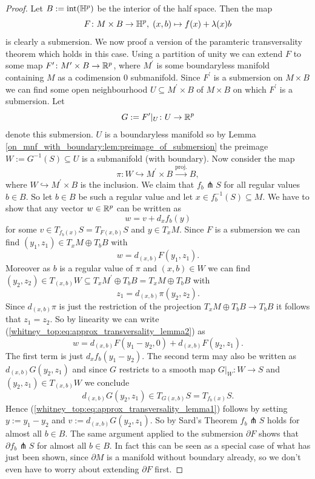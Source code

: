 \begin{proof}
    Let $B := \mathrm{int}(\mathbb{H}^p)$ be the interior of the half space. Then the map 
    \[
    F \colon M \times B \to \mathbb{H}^p, \; (x,b) \mapsto f(x) + \lambda(x)b
    \]
    is clearly a submersion. We now proof a version of the paramteric transversality theorem which holds in this case. Using a partition of unity we can extend $F$ to some map $F^\prime \colon M^\prime \times B \to \mathbb{R}^p$, where $M^\prime$ is some boundaryless manifold containing $M$ as a codimension $0$ submanifold. Since $F^\prime$ is a submersion on $M \times B$ we can find some open neighbourhood $U \subseteq M^\prime \times B$ of $M \times B$ on which $F^\prime$ is a submersion. Let 
    \[
    G := F^\prime|_U \colon U \to \mathbb{R}^p
    \]
    denote this submersion. $U$ is a boundaryless manifold so by Lemma \ref{on_mnf_with_boundary:lem:preimage_of_submersion} the preimage $W:= G^{-1}(S) \subseteq U$ is a submanifold (with boundary). Now consider the map 
    \[
    \pi \colon W \hookrightarrow M^\prime \times B \xrightarrow{\text{proj.}} B,
    \]
    where $W \hookrightarrow M^\prime \times B$ is the inclusion. We claim that $f_b \pitchfork S$ for all regular values $b \in B$. So let $b \in B$ be such a regular value and let $x \in f_b^{-1}(S)\subseteq M$. We have to show that any vector $w \in \mathbb{R}^p$ can be written as 
    \begin{equation}
        \label{whitney_top:eq:approx_transversality_lemma1}
    w = v + d_xf_b(y)
    \end{equation}
    for some $v \in T_{f_b(x)} S = T_{F(x,b)} S$ and $y \in T_xM$. Since $F$ is a submersion we can find $(y_1,z_1) \in T_x M \oplus T_b B$ with 
    \begin{equation}
        \label{whitney_top:eq:approx_transversality_lemma2}
    w = d_{(x,b)}F(y_1,z_1).
    \end{equation}
    Moreover as $b$ is a regular value of $\pi$ and $(x,b) \in W$ we can find $(y_2,z_2) \in T_{(x,b)}W \subseteq T_x M^\prime \oplus T_b B = T_x M \oplus T_b B$ with 
    \[
    z_1 = d_{(x,b)} \pi (y_2,z_2).
    \]
    Since $d_{(x,b)} \pi$ is just the restriction of the projection $T_xM \oplus T_b B \to T_b B$ it follows that $z_1 = z_2$. So by linearity we can write (\ref{whitney_top:eq:approx_transversality_lemma2}) as
    \[
    w = d_{(x,b)}F(y_1-y_2,0) + d_{(x,b)}F(y_2,z_1).
    \]
    The first term is just $d_xf_b(y_1-y_2)$. The second term may also be written as  $d_{(x,b)}G(y_2,z_1)$ and since $G$ restricts to a smooth map $G|_W \colon W \to S$ and $(y_2,z_1) \in T_{(x,b)}W$ we conclude $$d_{(x,b)}G(y_2,z_1) \in T_{G(x,b)} S = T_{f_b(x)}S.$$ Hence (\ref{whitney_top:eq:approx_transversality_lemma1}) follows by setting $y:= y_1-y_2$ and $v := d_{(x,b)}G(y_2,z_1)$. So by Sard's Theorem $f_b \pitchfork S$ holds for almost all $b \in B$. The same argument applied to the submersion $\partial F$ shows that $\partial f_b \pitchfork S$ for almost all $b \in B$. In fact this can be seen as a special case of what has just been shown, since $\partial M$ is a manifold without boundary already, so we don't even have to worry about extending $\partial F$ first.
\end{proof}

